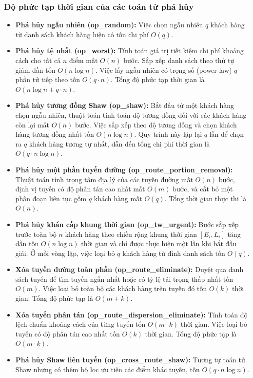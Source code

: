\documentclass[13pt,a4paper]{extarticle}
\begin{document}
\subsubsection{Độ phức tạp thời gian của các toán tử phá hủy}
\begin{itemize}[leftmargin=1.2cm]
  \item \textbf{Phá hủy ngẫu nhiên (op\_random):} Việc chọn ngẫu nhiên $q$ khách hàng từ danh sách khách hàng hiện có tốn chi phí $O(q)$.
  \item \textbf{Phá hủy tệ nhất (op\_worst):} Tính toán giá trị tiết kiệm chi phí khoảng cách cho tất cả $n$ điểm mất $O(n)$ bước. Sắp xếp danh sách theo thứ tự giảm dần tốn $O(n \log n)$. Việc lấy ngẫu nhiên có trọng số (power-law) $q$ phần tử tiếp theo tốn $O(q \cdot n)$. Tổng độ phức tạp thời gian là $O(n \log n + q \cdot n)$.
  \item \textbf{Phá hủy tương đồng Shaw (op\_shaw):} Bắt đầu từ một khách hàng chọn ngẫu nhiên, thuật toán tính toán độ tương đồng đối với các khách hàng còn lại mất $O(n)$ bước. Việc sắp xếp theo độ tương đồng và chọn khách hàng tương đồng nhất tốn $O(n \log n)$. Quy trình này lặp lại $q$ lần để chọn ra $q$ khách hàng tương tự nhất, dẫn đến tổng chi phí thời gian là $O(q \cdot n \log n)$.
  \item \textbf{Phá hủy một phần tuyến đường (op\_route\_portion\_removal):} Thuật toán tính trọng tâm địa lý của các tuyến đường mất $O(n)$ bước, định vị tuyến có độ phân tán cao nhất mất $O(m)$ bước, và cắt bỏ một phân đoạn liên tục gồm $q$ khách hàng mất $O(q)$. Tổng thời gian thực thi là $O(n)$.
  \item \textbf{Phá hủy khẩn cấp khung thời gian (op\_tw\_urgent):} Bước sắp xếp trước toàn bộ $n$ khách hàng theo chiều rộng khung thời gian $[E_i, L_i]$ tăng dần tốn $O(n \log n)$ thời gian và chỉ được thực hiện một lần khi bắt đầu giải. Ở mỗi vòng lặp, việc loại bỏ $q$ khách hàng từ đỉnh danh sách tốn $O(q)$.
  \item \textbf{Xóa tuyến đường toàn phần (op\_route\_eliminate):} Duyệt qua danh sách tuyến để tìm tuyến ngắn nhất hoặc có tỷ lệ tải trọng thấp nhất tốn $O(m)$. Việc loại bỏ toàn bộ các khách hàng trên tuyến đó tốn $O(k)$ thời gian. Tổng độ phức tạp là $O(m + k)$.
  \item \textbf{Xóa tuyến phân tán (op\_route\_dispersion\_eliminate):} Tính toán độ lệch chuẩn khoảng cách của từng tuyến tốn $O(m \cdot k)$ thời gian. Việc loại bỏ tuyến có độ phân tán cao nhất tốn $O(k)$ thời gian. Tổng độ phức tạp là $O(m \cdot k)$.
  \item \textbf{Phá hủy Shaw liên tuyến (op\_cross\_route\_shaw):} Tương tự toán tử Shaw nhưng có thêm bộ lọc ưu tiên các điểm khác tuyến, tốn $O(q \cdot n \log n)$.
\end{itemize}
\end{document}
